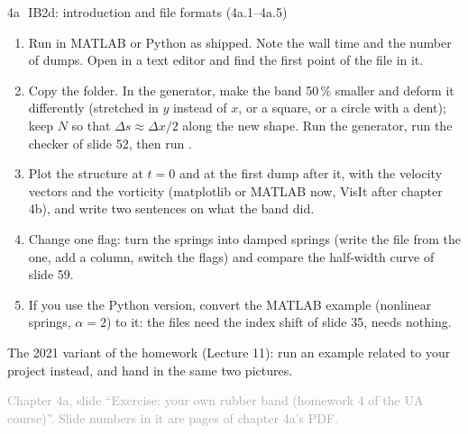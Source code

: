 \documentclass[aspectratio=169,11pt]{beamer}
\newcommand{\sourcecredit}[1]{\vfill\begin{flushright}\tiny\textcolor{DarkGray}{#1}\end{flushright}}
\begin{document}
\begin{frame}{4a\,\textbullet\ IB2d: introduction and file formats (4a.1--4a.5)}
\label{fr:c4ax1}
\small
\begin{enumerate}
  \item[4a.1] Run  in MATLAB or Python as shipped. Note the wall time and the number of dumps. Open  in a text editor and find the first point of the  file in it.
  \item[4a.2] Copy the folder. In the generator, make the band 50\,\% smaller and deform it differently (stretched in $y$ instead of $x$, or a square, or a circle with a dent); keep $N$ so that $\Delta s \approx \Delta x/2$ along the new shape. Run the generator, run the checker of slide 52, then run .
  \item[4a.3] Plot the structure at $t = 0$ and at the first dump after it, with the velocity vectors and the vorticity (matplotlib or MATLAB now, VisIt after chapter 4b), and write two sentences on what the band did.
  \item[4a.4] Change one flag: turn the springs into damped springs (write the  file from the  one, add a column, switch the flags) and compare the half-width curve of slide 59.
  \item[4a.5] If you use the Python version, convert the MATLAB  example (nonlinear springs, $\alpha = 2$) to it: the files need the index shift of slide 35,  needs nothing.
\end{enumerate}
 The 2021 variant of the homework (Lecture 11): run an example related to your project instead, and hand in the same two pictures.
\sourcecredit{Chapter 4a, slide ``Exercise: your own rubber band (homework 4 of the UA course)''. Slide numbers in it are pages of chapter 4a's PDF.}
\end{frame}
\end{document}
